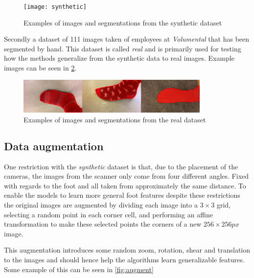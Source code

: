 \documentclass{kththesis}
\begin{document}
\begin{figure}[h]
  \centering
  \texttt{[image: synthetic]}
  \caption{Examples of images and segmentations from the synthetic dataset}
  \label{fig:data_synthetic}
\end{figure}

Secondly a dataset of 111 images taken of employees at \textit{Volumental} that
has been segmented by hand. This dataset is called \textit{real} and is
primarily used for testing how the methods generalize from  the synthetic data to
real images. Example images can be seen in \cref{fig:data_real}.

\begin{figure}[h]
  \centering
  \includegraphics[width=0.85\textwidth]{real}
  \caption{Examples of images and segmentations from the real dataset}
  \label{fig:data_real}
\end{figure}

\subsection{Data augmentation}
One restriction with the \textit{synthetic} dataset is that, due to the
placement of the cameras, the images from the
scanner only come from four different angles. Fixed with regards to the
foot and all taken from approximately the same
distance. To enable the models to learn more general foot features despite
these restrictions the original images are augmented by dividing each image into
a \(3\times3\) grid, selecting a random point in each corner cell, and
performing an affine transformation to make these selected points the corners of
a new \(256\times256 \textit{px}\) image.

This augmentation introduces some random zoom, rotation, shear and translation
to the images and should hence help the algorithms learn generalizable features.
Some example of this can be seen in \cref{fig:augment}
\end{document}
